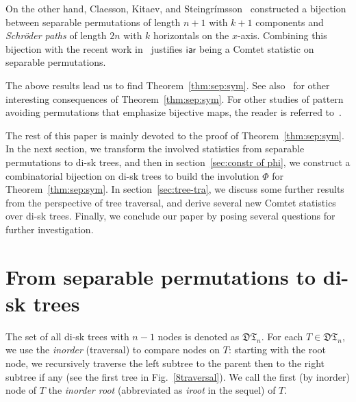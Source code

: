 \documentclass[12pt]{amsart}
\numberwithin{equation}{section}
\theoremstyle{plain}
\theoremstyle{definition}
\def\iar{\mathsf{iar}}
\newcommand{\DT}{\mathfrak{DT}}
\begin{document}
 On the other hand, Claesson, Kitaev, and Steingr\'imsson~\cite[Thm~2.2.48]{kit} constructed a bijection between separable permutations of length $n+1$ with $k+1$ components and {\em Schr\"oder paths} of length $2n$ with $k$ horizontals on the $x$-axis. Combining this bijection with the recent work in~\cite[Thm~3.2]{fw} justifies $\iar$ being a Comtet statistic on separable permutations. 
 
 The above results lead us to find Theorem~\ref{thm:sep:sym}. See also~\cite{flw} for other interesting consequences of Theorem~\ref{thm:sep:sym}.  For other studies of pattern avoiding permutations that emphasize bijective maps, the reader is referred to~\cite{CK,EP,LK,SS}. 

The rest of this paper is mainly devoted to the proof of Theorem~\ref{thm:sep:sym}. In the next section, we transform the involved statistics from separable permutations to di-sk trees, and then in section~\ref{sec:constr of phi}, we construct a combinatorial bijection on di-sk trees to build the involution $\Phi$ for Theorem~\ref{thm:sep:sym}. In section~\ref{sec:tree-tra}, we discuss some further results from the perspective of tree traversal, and derive several new Comtet statistics over di-sk trees. Finally, we conclude our paper by posing several questions for further investigation.












\section{From separable permutations to di-sk trees}
The set of all di-sk trees with $n-1$ nodes is denoted as $\DT_n$. For each $T\in\DT_n$, we use the \emph{inorder} (traversal) to compare nodes on $T$:  starting with the root node, we recursively traverse the left subtree to the parent then to the right subtree if any (see the first tree in Fig.~\ref{8traversal}). We call the first (by inorder) node of $T$ the \emph{inorder root} (abbreviated as {\em iroot} in the sequel) of $T$.
\end{document}
